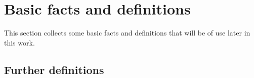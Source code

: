 \section{Basic facts and definitions}

This section collects some basic facts and definitions that will be of use later in this work.

\iffalse
\subsection{Algebraic Curves}


\begin{defi}
 The \emph{$n$-dimensional affine space} is the set $\Abb^n$ of $n$-tuples with entries in $\Cbb$.
\end{defi}

\begin{defi}
 For an ideal $J\subset \Cbb[x_1,\ldots,x_n]$ we define the \emph{zero set $V(J)$ of $J$} as the set of points $p \in \Cbb$. For a subset 
$X\subset \Abb^n$ we define the \emph{ideal $I(V)$ of $X$} as usual.
\end{defi}
\fi




\subsection{Further definitions}

